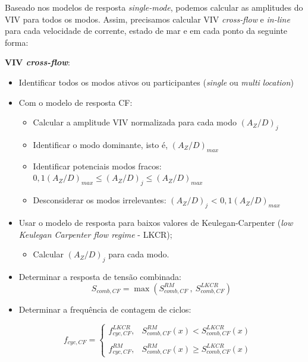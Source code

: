 Baseado nos modelos de resposta \textit{single-mode}, podemos calcular as amplitudes do VIV para todos os modos.
Assim, precisamos calcular VIV \textit{cross-flow} e \textit{in-line} para cada velocidade de corrente, estado de mar e em cada ponto da seguinte forma:

\textbf{VIV \textit{cross-flow}}:
\begin{itemize}
\item Identificar todos os modos ativos ou participantes (\textit{single} ou \textit{multi} \textit{location})
\item Com o modelo de resposta CF:
	\begin{itemize}
    \item Calcular a amplitude VIV normalizada para cada modo $(A_Z/D)_j$

	\item Identificar o modo dominante, isto é, $(A_Z/D)_\mathit{max}$

    \item Identificar potenciais modos fracos: $0,1(A_Z/D)_\mathit{max} \leq (A_Z/D)_j \leq (A_Z/D)_\mathit{max}$

    \item Desconsiderar os modos irrelevantes: $(A_Z/D)_j$ < $0,1(A_Z/D)_\mathit{max}$
    \end{itemize}
\item Usar o modelo de resposta para baixos valores de Keulegan-Carpenter (\textit{low Keulegan Carpenter flow regime} - LKCR);
	\begin{itemize}
	\item Calcular $(A_Z/D)_j$ para cada modo.
	\end{itemize}
    \item Determinar a resposta de tensão combinada:
        $$
        S_{\mathit{comb}, \mathit{CF}} = \max\left( S_{\mathit{comb}, \mathit{CF}}^\mathit{RM} ~,~ S_{\mathit{comb}, \mathit{CF}}^\mathit{LKCR} \right)
        $$
\item Determinar a frequência de contagem de ciclos:

$$
f_{\mathit{cyc}, \mathit{CF}} =
\left\{
\begin{matrix}
f_{\mathit{cyc}, \mathit{CF}}^\mathit{LKCR}, & S_{\mathit{comb},\mathit{CF}}^\mathit{RM}(x)    < S_{\mathit{comb},\mathit{CF}}^\mathit{LKCR}(x) & \\
\\
f_{\mathit{cyc}, \mathit{CF}}^\mathit{RM},   & S_{\mathit{comb},\mathit{CF}}^\mathit{RM}(x) \geq S_{\mathit{comb},\mathit{CF}}^\mathit{LKCR}(x)
\end{matrix}
\right.
$$

\end{itemize}

